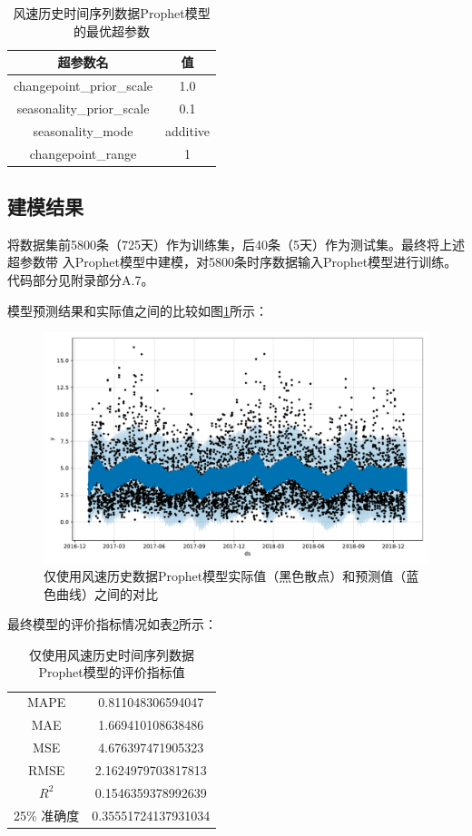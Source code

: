 \documentclass[AutoFakeBold]{LZUThesis}
\begin{document}
\begin{table}[H]
    \centering
    \caption{风速历史时间序列数据Prophet模型的最优超参数}
    \begin{tabular}{cc}
    \toprule
    超参数名 & 值 \\
    \midrule
    changepoint\_prior\_scale & 1.0 \\
    seasonality\_prior\_scale & 0.1 \\
    seasonality\_mode & additive \\
    changepoint\_range & 1 \\
    \bottomrule
    \end{tabular}
    \label{prophet_param}
\end{table}

\subsection{建模结果}

将数据集前5800条（725天）作为训练集，后40条（5天）作为测试集。最终将上述超参数带
入Prophet模型中建模，对5800条时序数据输入Prophet模型进行训练。代码部分见附录部分A.7。

模型预测结果和实际值之间的比较如图\ref{fig_prophet_wind}所示：

\begin{figure}[H]
	\centering
    \includegraphics[width=1\textwidth]{figures/prophet_wind.pdf}
    \caption{仅使用风速历史数据Prophet模型实际值（黑色散点）和预测值（蓝色曲线）之间的对比}
    \label{fig_prophet_wind}
\end{figure}

最终模型的评价指标情况如表\ref{wind_prophet_result}所示：

\begin{table}[H]
    \centering
    \caption{仅使用风速历史时间序列数据Prophet模型的评价指标值}
    \begin{tabular}{cc}
    \toprule
    MAPE & 0.811048306594047 \\
    MAE & 1.669410108638486 \\
    MSE & 4.676397471905323 \\
    RMSE & 2.1624979703817813 \\
    $R^2$ & 0.1546359378992639 \\
    25\% 准确度 & 0.35551724137931034 \\
    \bottomrule
    \end{tabular}
    \label{wind_prophet_result}
\end{table}
\end{document}
